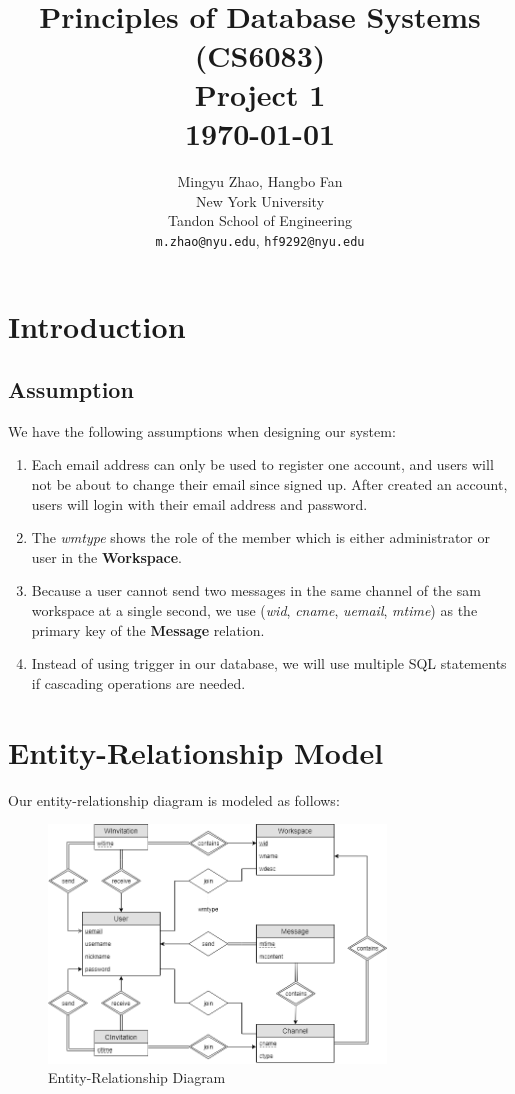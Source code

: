 \documentclass{article}
\title{
    \normalsize \textsc{} \\[2.0cm]
    \HRule{1pt} \\[0.3cm]
    \LARGE \textbf{Principles of Database Systems (CS6083)}
    \HRule{1pt} \\[0.5cm]
    \Large Project 1 \\[0.5cm]
    \normalsize \today
}
\author{
    Mingyu Zhao, Hangbo Fan \\
    New York University \\
    Tandon School of Engineering \\
    \texttt{m.zhao@nyu.edu}, \texttt{hf9292@nyu.edu} \\
}
\begin{document}
\thispagestyle{empty}
\printtitle%
      \vfill
\printauthor%
\newpage

\section{Introduction}

\subsection{Assumption}
We have the following assumptions when designing our system:
\begin{enumerate}
    \item Each email address can only be used to register one account, and users will not be about to change their email since signed up. After created an account, users will login with their email address and password.
    \item The \textit{wmtype} shows the role of the member which is either administrator or user in the \textbf{Workspace}.
    \item Because a user cannot send two messages in the same channel of the sam workspace at a single second, we use (\textit{wid}, \textit{cname}, \textit{uemail}, \textit{mtime}) as the primary key of the \textbf{Message} relation.
    \item Instead of using trigger in our database, we will use multiple SQL statements if cascading operations are needed.
\end{enumerate}


\section{Entity-Relationship Model}
Our entity-relationship diagram is modeled as follows:

\begin{figure}[ht!]
    \centering
    \includegraphics[width=0.8\textwidth]{img/erd.png}
    \caption{Entity-Relationship Diagram}
\end{figure}
\end{document}
